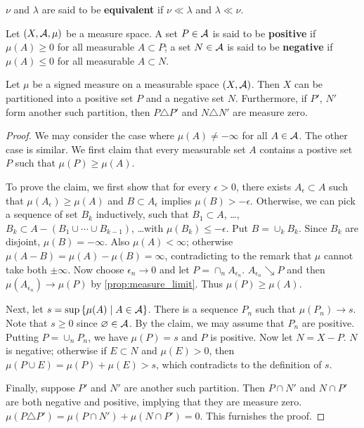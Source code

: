 \begin{definition}
    $\nu$ and $\lambda$ are said to be \textbf{equivalent} if $\nu\ll\lambda$ 
    and $\lambda\ll\nu$.
\end{definition}

\begin{definition}
    Let $(X,\mathcal{A},\mu)$ be a measure space. A set $P\in\mathcal{A}$ is said to be 
    \textbf{positive} if $\mu(A)\geq 0$ for all measurable $A\subset P$; 
    a set $N\in\mathcal{A}$ is said to be \textbf{negative} if $\mu(A)\leq 0$ for 
    all measurable $A\subset N$.
\end{definition}

\begin{theorem}
    Let $\mu$ be a signed measure on a measurable space $(X,\mathcal{A})$. Then 
    $X$ can be partitioned into a positive set $P$ and a negative set $N$. 
    Furthermore, if $P'$, $N'$ form another such partition, then 
    $P\triangle P'$ and $N\triangle N'$ are measure zero.
\end{theorem}
\begin{proof}
    We may consider the case where $\mu(A)\neq -\infty$ for all $A\in\mathcal{A}$. 
    The other case is similar. We first claim that every measurable set 
    $A$ contains a postive set $P$ such that $\mu(P)\geq\mu(A)$. 

    To prove the claim, we first show that for every $\epsilon>0$, 
    there exists $A_\epsilon\subset A$ such that $\mu(A_\epsilon)
    \geq\mu(A)$ and $B\subset A_\epsilon$ implies $\mu(B)>-\epsilon$. 
    Otherwise, we can pick a sequence of set $B_k$ inductively, 
    such that $B_1\subset A$, \ldots, 
    $B_k\subset A-(B_1\cup\cdots\cup B_{k-1})$, \ldots with 
    $\mu(B_k)\leq -\epsilon$. Put $B = \cup_k B_k$. Since $B_k$ 
    are disjoint, $\mu(B) = -\infty$. Also $\mu(A)<\infty$; otherwise $\mu(A-B) = \mu(A)-\mu(B) 
    = \infty$, contradicting to the remark that $\mu$ cannot 
    take both $\pm\infty$. Now choose $\epsilon_n\to 0$ and let 
    $P = \cap_n A_{\epsilon_n}$. $A_{\epsilon_n}\searrow P$ and then 
    $\mu(A_{\epsilon_n})\to\mu(P)$ by \cref{prop:measure_limit}. 
    Thus $\mu(P)\geq\mu(A)$.

    Next, let $s = \sup\left\{ \mu(A) \;\middle\vert\; A\in\mathcal{A} \right\}$. There is a sequence 
    $P_n$ such that $\mu(P_n)\to s$. Note that $s\geq 0$ since 
    $\varnothing\in\mathcal{A}$. By the claim, we may assume that $P_n$ are 
    positive. Putting $P = \cup_n P_n$, we have $\mu(P) = s$ 
    and $P$ is positive. Now let $N = X-P$. $N$ is negative; 
    otherwise if $E\subset N$ and $\mu(E)>0$, then $\mu(P\cup E) 
    = \mu(P) + \mu(E) > s$, which contradicts to the definition 
    of $s$. 

    Finally, suppose $P'$ and $N'$ are another such partition. 
    Then $P\cap N'$ and $N\cap P'$ are both negative and positive, 
    implying that they are measure zero. $\mu(P\triangle P') 
    = \mu(P\cap N') + \mu(N\cap P') = 0$. This furnishes the 
    proof.
\end{proof}

